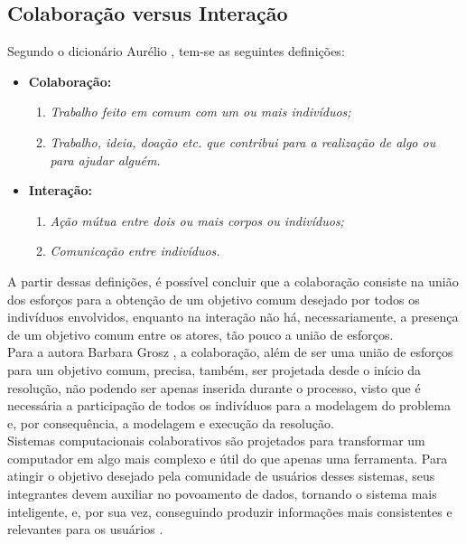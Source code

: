 \subsection{Colaboração versus Interação}
Segundo o dicionário Aurélio \cite{aurelio}, tem-se as seguintes definições:%
\begin{itemize}
  \item \textbf{Colaboração:}
  \begin{enumerate}
    \item \textit{Trabalho feito em comum com um ou mais indivíduos;}
    \item \textit{Trabalho, ideia, doação etc. que contribui para a realização de algo ou para ajudar alguém.}
  \end{enumerate}
\newpage
  \item \textbf{Interação:}
  \begin{enumerate}
    \item \textit{Ação mútua entre dois ou mais corpos ou indivíduos;}
    \item \textit{Comunicação entre indivíduos.}
  \end{enumerate}
\end{itemize}
 \null
\quad A partir dessas definições, é possível concluir que a colaboração consiste na união dos esforços
para a obtenção de um objetivo comum desejado por todos os indivíduos envolvidos, enquanto na interação
não há, necessariamente, a presença de um objetivo comum entre os atores, tão pouco a união de esforços. \\ \null \quad
Para a autora Barbara Grosz \cite{cbarbara}, a colaboração, além de ser uma união de esforços para um objetivo comum,
precisa, também, ser projetada desde o início da resolução, não podendo ser apenas inserida durante o processo, visto que é
necessária a participação de todos os indivíduos para a modelagem do problema e, por consequência, a modelagem e execução da resolução.
\\
\null \quad Sistemas computacionais colaborativos são projetados para transformar um computador em algo mais complexo e útil do que apenas uma ferramenta.
Para atingir o objetivo desejado pela comunidade de usuários desses sistemas, seus integrantes devem auxiliar no povoamento de dados,
tornando o sistema mais inteligente, e, por sua vez, conseguindo produzir informações mais consistentes e relevantes para os usuários \cite{cbarbara}.

